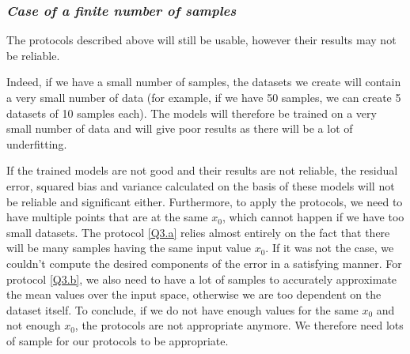 \subsubsection{{\it Case of a finite number of samples}}
The protocols described above will still be usable, however their results may not be reliable.\par
Indeed, if we have a small number of samples, the datasets we create will contain a very small number of data (for example, if we have \num{50} samples, we can create \num{5} datasets of \num{10} samples each). The models will therefore be trained on a very small number of data and will give poor results as there will be a lot of underfitting.\par
If the trained models are not good and their results are not reliable, the residual error, squared bias and variance calculated on the basis of these models will not be reliable and significant either. Furthermore, to apply the protocols, we need to have multiple points that are at the same $x_0$, which cannot happen if we have too small datasets. The protocol \ref{Q3.a} relies almost entirely on the fact that there will be many samples having the same input value $x_0$. If it was not the case, we couldn't compute the desired components of the error in a satisfying manner. For protocol \ref{Q3.b}, we also need to have a lot of samples to accurately approximate the mean values over the input space, otherwise we are too dependent on the dataset itself. To conclude, if we do not have enough values for the same $x_0$ and not enough $x_0$, the protocols are not appropriate anymore. We therefore need lots of sample for our protocols to be appropriate.

